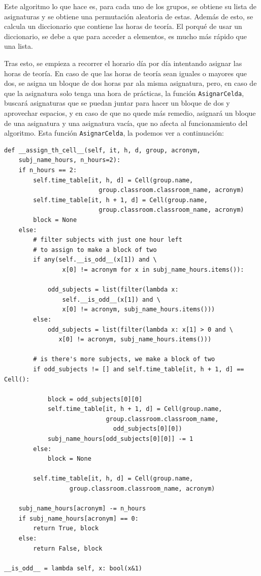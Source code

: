 Este algoritmo lo que hace es, para cada uno de los grupos, se obtiene su lista de asignaturas y se obtiene una permutación aleatoria de estas. Además de esto, se calcula un diccionario que contiene las horas de teoría. El porqué de usar un diccionario, se debe a que para acceder a elementos, es mucho más rápido que una lista.

Tras esto, se empieza a recorrer el horario día por día intentando asignar las horas de teoría. En caso de que las horas de teoría sean iguales o mayores que dos, se asigna un bloque de dos horas par ala misma asignatura, pero, en caso de que la asignatura solo tenga una hora de prácticas, la función \texttt{AsignarCelda}, buscará asignaturas que se puedan juntar para hacer un bloque de dos y aprovechar espacios, y en caso de que no quede más remedio, asignará un bloque de una asignatura y una asignatura vacía, que no afecta al funcionamiento del algoritmo. Esta función \texttt{AsignarCelda}, la podemos ver a continuación:

\begin{verbatim}
def __assign_th_cell__(self, it, h, d, group, acronym, 
    subj_name_hours, n_hours=2):
    if n_hours == 2:
        self.time_table[it, h, d] = Cell(group.name, 
                          group.classroom.classroom_name, acronym)
        self.time_table[it, h + 1, d] = Cell(group.name, 
                          group.classroom.classroom_name, acronym)
        block = None
    else:
        # filter subjects with just one hour left 
        # to assign to make a block of two
        if any(self.__is_odd__(x[1]) and \
                x[0] != acronym for x in subj_name_hours.items()):
            
            odd_subjects = list(filter(lambda x: 
                self.__is_odd__(x[1]) and \
                x[0] != acronym, subj_name_hours.items()))
        else:
            odd_subjects = list(filter(lambda x: x[1] > 0 and \
               x[0] != acronym, subj_name_hours.items()))

        # is there's more subjects, we make a block of two
        if odd_subjects != [] and self.time_table[it, h + 1, d] == Cell():
            
            block = odd_subjects[0][0]
            self.time_table[it, h + 1, d] = Cell(group.name, 
                            group.classroom.classroom_name, 
                              odd_subjects[0][0])
            subj_name_hours[odd_subjects[0][0]] -= 1
        else:
            block = None

        self.time_table[it, h, d] = Cell(group.name, 
                  group.classroom.classroom_name, acronym)

    subj_name_hours[acronym] -= n_hours
    if subj_name_hours[acronym] == 0:
        return True, block
    else:
        return False, block

__is_odd__ = lambda self, x: bool(x&1)
\end{verbatim}

